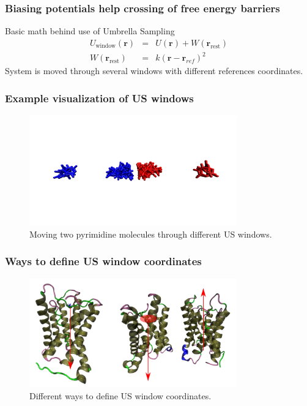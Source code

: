\documentclass{beamer}
\numberwithin{table}{section}
\numberwithin{figure}{section}
\numberwithin{equation}{section}
\renewcommand{\vec}[1]{\mathbf{#1}}
\begin{document}
\begin{frame}
\frametitle{Biasing potentials help crossing of free energy barriers}
        {Basic math behind use of Umbrella Sampling}
        {
                \begin{eqnarray*}
                    U_{\text{window}}\left( \vec{r} \right) &=& U\left( \vec{r}\right) + W\left( \vec{r}_{\text{rest}} \right) \\
                    W\left( \vec{r}_{\text{rest}} \right) &=& k\left( \vec{r} - \vec{r}_{ref} \right)^2
                \end{eqnarray*}
        }
        {System is moved through several windows with different references coordinates.}
\end{frame}

\begin{frame}
\frametitle{Example visualization of US windows}
    \begin{figure}[htb]
        \centering
        \includegraphics[keepaspectratio=true, width=0.8\textwidth]{figures/pyrimidine-us.png}
        \caption{Moving two pyrimidine molecules through different US windows.}
    \end{figure}
\end{frame}

\begin{frame}
\frametitle{Ways to define US window coordinates}
    \begin{figure}[htb]
        \centering
        \includegraphics[keepaspectratio=true, width=0.8\textwidth]{figures/us-coord-define.pdf}
        \caption{Different ways to define US window coordinates.}
    \end{figure}
\end{frame}
\end{document}

